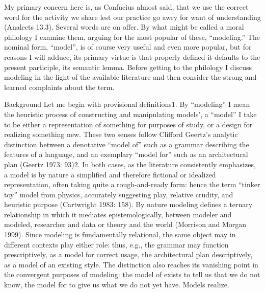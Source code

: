 My primary concern here is, as Confucius almost said, that we use the
correct word for the activity we share lest our practice go awry for
want of understanding (Analects 13.3). Several words are on offer. By
what might be called a moral philology I examine them, arguing for the
most popular of these, ``modeling.'' The nominal form, ``model'', is of
course very useful and even more popular, but for reasons I will adduce,
its primary virtue is that properly defined it defaults to the present
participle, its semantic lemma. Before getting to the philology I
discuss modeling in the light of the available literature and then
consider the strong and learned complaints about the term.

Background Let me begin with provisional definitions1. By ``modeling'' I
mean the heuristic process of constructing and manipulating models', a
``model'' I take to be either a representation of something for purposes
of study, or a design for realizing something new. These two senses
follow Clifford Geertz's analytic distinction between a denotative
``model of'' such as a grammar describing the features of a language,
and an exemplary ``model for'' such as an architectural plan (Geertz
1973: 93)2. In both cases, as the literature consistently emphasizes, a
model is by nature a simplified and therefore fictional or idealized
representation, often taking quite a rough-and-ready form: hence the
term ``tinker toy'' model from physics, accurately suggesting play,
relative crudity, and heuristic purpose (Cartwright 1983: 158). By
nature modeling defines a ternary relationship in which it mediates
epistemologically, between modeler and modeled, researcher and data or
theory and the world (Morrison and Morgan 1999). Since modeling is
fundamentally relational, the same object may in different contexts play
either role: thus, e.g., the grammar may function prescriptively, as a
model for correct usage, the architectural plan descriptively, as a
model of an existing style. The distinction also reaches its vanishing
point in the convergent purposes of modeling: the model of exists to
tell us that we do not know, the model for to give us what we do not yet
have. Models realize.

